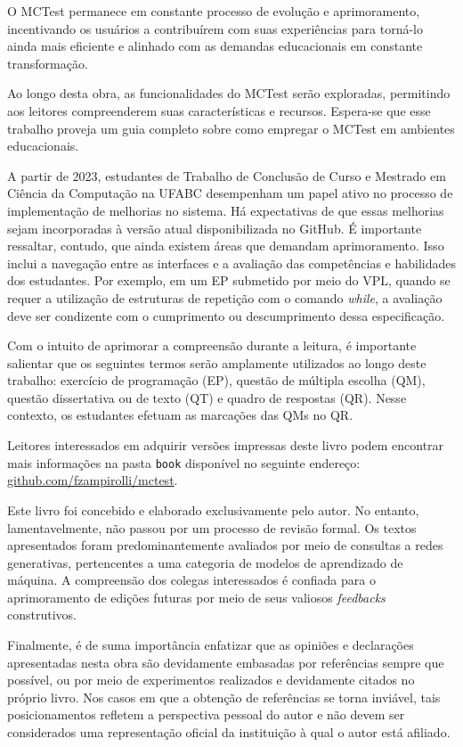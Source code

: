 O MCTest permanece em constante processo de evolução e aprimoramento, incentivando os usuários a contribuírem com suas experiências para torná-lo ainda mais eficiente e alinhado com as demandas educacionais em constante transformação.

Ao longo desta obra, as funcionalidades do MCTest serão exploradas, permitindo aos leitores compreenderem suas características e recursos. Espera-se que esse trabalho proveja um guia completo sobre como empregar o MCTest em ambientes educacionais.

A partir de 2023, estudantes de Trabalho de Conclusão de Curso e Mestrado em Ciência da Computação na UFABC desempenham um papel ativo no processo de implementação de melhorias no sistema. Há expectativas de que essas melhorias sejam incorporadas à versão atual disponibilizada no GitHub. É importante ressaltar, contudo, que ainda existem áreas que demandam aprimoramento. Isso inclui a navegação entre as interfaces e a avaliação das competências e habilidades dos estudantes. Por exemplo, em um EP submetido por meio do VPL, quando se requer a utilização de estruturas de repetição com o comando \textit{while}, a avaliação deve ser condizente com o cumprimento ou descumprimento dessa especificação.

Com o intuito de aprimorar a compreensão durante a leitura, é importante salientar que os seguintes termos serão amplamente utilizados ao longo deste trabalho: exercício de programação (EP), questão de múltipla escolha (QM), questão dissertativa ou de texto (QT) e quadro de respostas (QR). Nesse contexto, os estudantes efetuam as marcações das QMs no QR.

Leitores interessados em adquirir versões impressas deste livro podem encontrar mais informações na pasta \verb|book| disponível no seguinte endereço:
\href{https://github.com/fzampirolli/mctest/tree/master/book/1ed-br}{github.com/fzampirolli/mctest}.

Este livro foi concebido e elaborado exclusivamente pelo autor. No entanto, lamentavelmente, não passou por um processo de revisão formal. Os textos apresentados foram predominantemente avaliados por meio de consultas a redes generativas, pertencentes a uma categoria de modelos de aprendizado de máquina. A compreensão dos colegas interessados é confiada para o aprimoramento de edições futuras por meio de seus valiosos \textit{feedbacks} construtivos.

Finalmente, é de suma importância enfatizar que as opiniões e declarações apresentadas nesta obra são devidamente embasadas por referências sempre que possível, ou por meio de experimentos realizados e devidamente citados no próprio livro. Nos casos em que a obtenção de referências se torna inviável, tais posicionamentos refletem a perspectiva pessoal do autor e não devem ser considerados uma representação oficial da instituição à qual o autor está afiliado.

